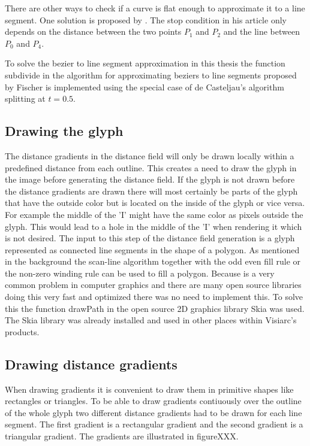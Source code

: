 There are other ways to check if a curve is flat enough to approximate it to a line segment. One solution is proposed by \citet{bezier_subdivision}. The stop condition in his article only depends on the distance between the two points $P_1$ and $P_2$ and the line between $P_0$ and $P_4$.

To solve the bezier to line segment approximation in this thesis the function subdivide in the algorithm for approximating beziers to line segments proposed by Fischer is implemented using the special case of de Casteljau's algorithm splitting at $t=0.5$.  
\subsection{Drawing the glyph}
The distance gradients in the distance field will only be drawn locally within a predefined distance from each outline. This creates a need to draw the glyph in the image before generating the distance field. If the glyph is not drawn before the distance gradients are drawn there will most certainly be parts of the glyph that have the outside color but is located on the inside of the glyph or vice versa. For example the middle of the 'I' might have the same color as pixels outside the glyph. This would lead to a hole in the middle of the 'I' when rendering it which is not desired. The input to this step of the distance field generation is a glyph represented as connected line segments in the shape of a polygon. As mentioned in the background the scan-line algorithm together with the odd even fill rule or the non-zero winding rule can be used to fill a polygon. Because is a very common problem in computer graphics and there are many open source libraries doing this very fast and optimized there was no need to implement this. To solve this the function drawPath in the open source 2D graphics library Skia was used. The Skia library was already installed and used in other places within Visiarc's products.
\subsection{Drawing distance gradients}
When drawing gradients it is convenient to draw them in primitive shapes like rectangles or triangles. To be able to draw gradients contiuously over the outline of the whole glyph two different distance gradients had to be drawn for each line segment. The first gradient is a rectangular gradient and the second gradient is a triangular gradient. The gradients are illustrated in figureXXX.

